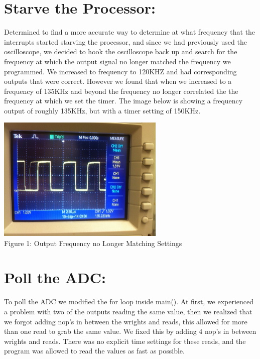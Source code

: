 \documentclass[twoside]{article}
\begin{document}
\begin{multicols}{2}

\section{Starve the Processor:}

Determined to find a more accurate way to determine at what frequency that the interrupts started starving the processor, and since we had previously used the oscilloscope, we decided to hook the oscilloscope back up and search for the frequency at which the output signal no longer matched the frequency we programmed. We increased to frequency to 120KHZ and had corresponding outputs that were correct. However we found that when we increased to a frequency of 135KHz and beyond the frequency no longer correlated the the frequency at which we set the timer. The image below is showing a frequency output of roughly 135KHz, but with a timer setting of 150KHz.\\

\begin{center}
\includegraphics*[width = 8cm]{Fig3.jpg}\\
Figure 1: Output Frequency no Longer Matching Settings
\end{center}


\section{Poll the ADC:}

\noindent  To poll the ADC we modified the for loop inside main(). At first, we experienced a problem with two of the outputs reading the same value, then we realized that we forgot adding nop's in between the wrights and reads, this allowed for more than one read to grab the same value. We fixed this by adding 4 nop's in between wrights and reads. There was no explicit time settings for these reads, and the program was allowed to read the values as fast as possible.


\end{multicols}
\end{document}
